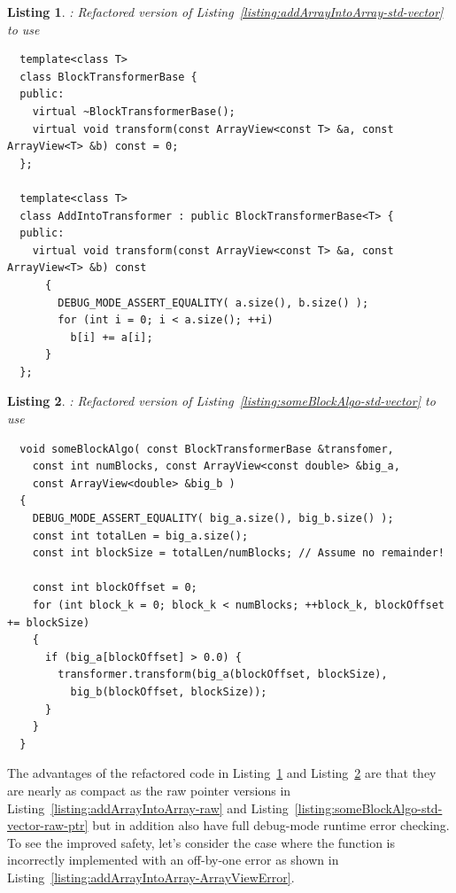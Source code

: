 \documentclass[pdf,ps2pdf,11pt]{SANDreport}
\newtheorem{listing}{Listing}
\begin{document}
{}\begin{listing}: Refactored version of
Listing~\ref{listing:addArrayIntoArray-std-vector} to use
{}
\\
\label{listing:addArrayIntoArray-ArrayView}
{\small\begin{verbatim}
  template<class T>
  class BlockTransformerBase {
  public:
    virtual ~BlockTransformerBase();
    virtual void transform(const ArrayView<const T> &a, const ArrayView<T> &b) const = 0;
  };

  template<class T>
  class AddIntoTransformer : public BlockTransformerBase<T> {
  public:
    virtual void transform(const ArrayView<const T> &a, const ArrayView<T> &b) const
      {
        DEBUG_MODE_ASSERT_EQUALITY( a.size(), b.size() );
        for (int i = 0; i < a.size(); ++i)
          b[i] += a[i];
      }
  };
\end{verbatim}}
\end{listing}


{}\begin{listing}: Refactored version of
Listing~\ref{listing:someBlockAlgo-std-vector} to use
{} \\
\label{listing:someBlockAlgo-ArrayView}
{\small\begin{verbatim}
  void someBlockAlgo( const BlockTransformerBase &transfomer,
    const int numBlocks, const ArrayView<const double> &big_a,
    const ArrayView<double> &big_b )
  {
    DEBUG_MODE_ASSERT_EQUALITY( big_a.size(), big_b.size() );
    const int totalLen = big_a.size();
    const int blockSize = totalLen/numBlocks; // Assume no remainder!
    
    const int blockOffset = 0;
    for (int block_k = 0; block_k < numBlocks; ++block_k, blockOffset += blockSize)
    {
      if (big_a[blockOffset] > 0.0) {
        transformer.transform(big_a(blockOffset, blockSize),
          big_b(blockOffset, blockSize));
      }
    }
  }
\end{verbatim}}
\end{listing}


The advantages of the refactored code in
Listing~\ref{listing:addArrayIntoArray-ArrayView} and
Listing~\ref{listing:someBlockAlgo-ArrayView} are that they are nearly
as compact as the raw pointer versions in
Listing~\ref{listing:addArrayIntoArray-raw} and
Listing~\ref{listing:someBlockAlgo-std-vector-raw-ptr} but in addition
also have full debug-mode runtime error checking.  To see the improved
safety, let's consider the case where the {}
function is incorrectly implemented with an off-by-one error as shown
in Listing~\ref{listing:addArrayIntoArray-ArrayViewError}.
\end{document}
